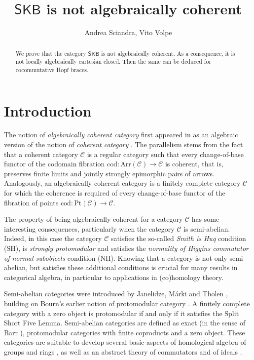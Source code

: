 \documentclass{amsart}
\title{$\mathsf{SKB}$ is not algebraically coherent}
\author{Andrea Sciandra, Vito Volpe}
\date{}
\theoremstyle{definition}
\begin{document}
\begin{abstract}
We prove that the category $\mathsf{SKB}$ is not algebraically coherent. As a consequence, it is not locally algebraically cartesian closed. Then the same can be deduced for cocommutative Hopf braces.
\end{abstract}

\maketitle

\tableofcontents

\section{Introduction}
The notion of \textit{algebraically coherent category} first appeared in \cite{CGvdL} as an algebraic version of the notion of \textit{coherent category} \cite{PTJ}. The parallelism stems from the fact that a coherent category $\mathcal{C}$ is a regular category such that every change-of-base functor of the codomain fibration $\mathrm{cod}: \mathrm{Arr}(\mathcal{C}) \longrightarrow \mathcal{C}$ is coherent, that is, preserves finite limits and jointly strongly epimorphic pairs of arrows. Analogously, an algebraically coherent category is a finitely complete category $\mathcal{C}$ for which the coherence is required of every change-of-base functor of the fibration of points $\mathrm{cod}: \mathrm{Pt}(\mathcal{C}) \longrightarrow \mathcal{C}$. 

The property of being algebraically coherent for a category $\mathcal{C}$ has some interesting consequences, particularly when the category $\mathcal{C}$ is semi-abelian. Indeed, in this case the category $\mathcal{C}$ satisfies the so-called \textit{Smith is Huq} condition (SH), is \textit{strongly protomodular} and satisfies the \textit{normality of Higgins commutator of normal subobjects} condition (NH). Knowing that a category is not only semi-abelian, but satisfies these additional conditions is crucial for many results in categorical algebra, in particular to applications in (co)homology theory. 

Semi-abelian categories were introduced by Janelidze, Márki and Tholen \cite{JMT}, building on Bourn's earlier notion of protomodular category \cite{Bourn1991}. A finitely complete category with a zero object is protomodular if and only if it satisfies the Split Short Five Lemma. Semi-abelian categories are defined as exact (in the sense of Barr \cite{Barr}), protomodular categories with finite coproducts and a zero object. These categories are suitable to develop several basic aspects of homological algebra of groups and rings \cite{Bourn2001}, as well as an abstract theory of commutators and of ideals \cite{Bourn2000}. %
\end{document}
